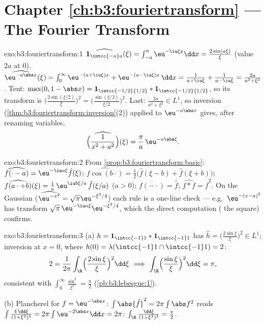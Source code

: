 \section*{Chapter \ref{ch:b3:fouriertransform} --- The Fourier
Transform}

\begin{solution}{exo:b3:fouriertransform:1}
$\widehat{\mathbf 1_{\intcc{-a}a}}(\xi) =
\int_{-a}^a\eu^{-\iu\xi x}\dd x = \frac{2\sin(a\xi)}{\xi}$
(value $2a$ at $0$).
$\widehat{\eu^{-a\abs x}}(\xi) = \int_0^\infty\eu^{-(a +
\iu\xi)x} + \eu^{-(a - \iu\xi)x}\,\dd x = \frac1{a + \iu\xi} +
\frac1{a - \iu\xi} = \frac{2a}{a^2 + \xi^2}$.
Tent: $\max(0, 1 - \abs x) = \mathbf 1_{\intcc{-1/2}{1/2}} *
\mathbf 1_{\intcc{-1/2}{1/2}}$, so its transform is
$\bigl(\frac{2\sin(\xi/2)}\xi\bigr)^2 =
\bigl(\frac{\sin(\xi/2)}{\xi/2}\bigr)^2$.
Last: $\frac{2a}{a^2+\xi^2} \in L^1$, so inversion
(\cref{thm:b3:fouriertransform:inversion}(2)) applied to
$\eu^{-a\abs x}$ gives, after renaming variables,
\[
\widehat{\Bigl(\frac1{x^2 + a^2}\Bigr)}(\xi) =
\frac{\pi}{a}\,\eu^{-a\abs\xi} .
\]
\end{solution}

\begin{solution}{exo:b3:fouriertransform:2}
From \cref{prop:b3:fouriertransform:basic}:
$\widehat{f(\cdot - a)} = \eu^{-\iu a\xi}\hat f(\xi)$;
$\widehat{f\cos(b\cdot)} = \frac12\bigl(\hat f(\xi - b) + \hat
f(\xi + b)\bigr)$;
$\widehat{f(a\cdot + b)}(\xi) = \frac1a\,\eu^{\iu
b\xi/a}\,\hat f(\xi/a)$ ($a > 0$);
$\widehat{\overline{f(-\cdot)}} = \overline{\hat f}$;
$\widehat{f * f} = \hat f^2$. On the Gaussian
($\widehat{\eu^{-x^2}} = \sqrt\pi\eu^{-\xi^2/4}$) each rule is
a one-line check --- e.g.\ $\eu^{-(x-a)^2}$ has transform
$\sqrt\pi\,\eu^{-\iu a\xi}\eu^{-\xi^2/4}$, which the direct
computation ( the square) confirms.
\end{solution}

\begin{solution}{exo:b3:fouriertransform:3}
(a) $h = \mathbf 1_{\intcc{-1}1}*\mathbf 1_{\intcc{-1}1}$ has
$\hat h = \bigl(\frac{2\sin\xi}\xi\bigr)^2 \in L^1$; inversion
at $x = 0$, where $h(0) = \lambda(\intcc{-1}1\cap\intcc{-1}1)
= 2$:
\[
2 = \frac1{2\pi}\int_\R\Bigl(\frac{2\sin\xi}\xi\Bigr)^2
\dd\xi
\ \Longrightarrow\
\int_\R\Bigl(\frac{\sin\xi}\xi\Bigr)^2\dd\xi = \pi ,
\]
consistent with $\int_0^\infty\frac{\sin^2}{\xi^2} =
\frac\pi2$ (\cref{pb:b3:lebesgue:1}).

(b) Plancherel for $f = \eu^{-\abs x}$: $\int\abs{\hat f}^2 =
2\pi\int\abs f^2$ reads $\int\frac{4\,\dd\xi}{(1 + \xi^2)^2} =
2\pi\int\eu^{-2\abs x}\dd x = 2\pi$:
$\int_\R\frac{\dd\xi}{(1+\xi^2)^2} = \frac\pi2$.
\end{solution}

